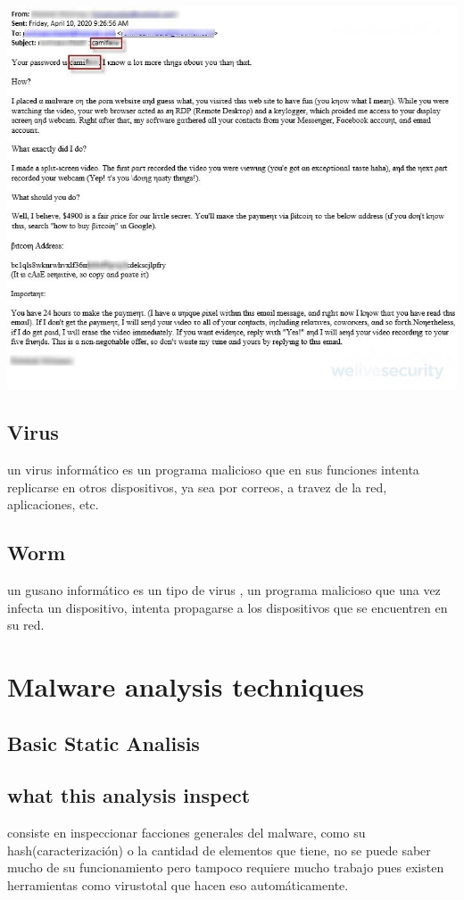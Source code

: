 \documentclass[10pt,a4paper]{article} %
\begin{document}
                \\ \includegraphics[width=0.8\linewidth]{scam.jpeg}
                \\ 

            \subsection{Virus}
                un virus informático es un programa malicioso que en sus
                funciones intenta replicarse en otros dispositivos, ya sea por
                correos, a travez de la red, aplicaciones, etc.

            \subsection{Worm}
                un gusano informático es un tipo de virus , un programa
                malicioso que una vez
                infecta un dispositivo, intenta propagarse a los dispositivos
                que se encuentren en su red. 
                \\ 


                
        \section{Malware analysis techniques}
            \subsection{Basic Static Analisis}
                \subsection{what this analysis inspect}
                    consiste en inspeccionar facciones generales del malware,
                    como su hash(caracterización) o la cantidad de elementos
                    que tiene, no se puede saber mucho de su funcionamiento
                    pero tampoco requiere mucho trabajo pues existen
                    herramientas como virustotal que hacen eso automáticamente.
\end{document}
